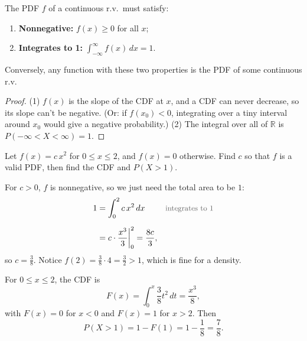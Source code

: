 \begin{theorem}\label{thm:validpdf}
The PDF $f$ of a continuous r.v.\ must satisfy:
\medskip
\begin{enumerate}
  \setlength{\itemsep}{0.4em}
  \item \textbf{Nonnegative:} $f(x) \ge 0$ for all $x$;
  \item \textbf{Integrates to 1:} $\displaystyle\int_{-\infty}^{\infty} f(x)\,dx = 1$.
\end{enumerate}
\medskip
Conversely, any function with these two properties is the PDF of some continuous r.v.
\end{theorem}

\medskip

\begin{proof}
(1) $f(x)$ is the slope of the CDF at $x$, and a CDF can never decrease, so its slope can't be negative. (Or: if $f(x_0) < 0$, integrating over a tiny interval around $x_0$ would give a negative probability.) (2) The integral over all of $\mathbb{R}$ is $P(-\infty < X < \infty) = 1$.
\end{proof}

\bigskip

\begin{example}\label{ex:cx2}
Let $f(x) = c\,x^{2}$ for $0 \le x \le 2$, and $f(x) = 0$ otherwise. Find $c$ so that $f$ is a valid PDF, then find the CDF and $P(X > 1)$.
\end{example}

\medskip

\begin{solution}
For $c > 0$, $f$ is nonnegative, so we just need the total area to be $1$:
\medskip
\begin{align*}
1 &= \int_{0}^{2} c\,x^{2}\,dx
  && \by{integrates to 1} \\[0.6em]
  &= c \cdot \frac{x^{3}}{3}\bigg|_{0}^{2} = \frac{8c}{3},
\end{align*}
\medskip
so $c = \tfrac{3}{8}$. Notice $f(2) = \tfrac{3}{8} \cdot 4 = \tfrac{3}{2} > 1$, which is fine for a density.

\medskip

For $0 \le x \le 2$, the CDF is
\medskip
\[
F(x) = \int_{0}^{x} \frac{3}{8} t^{2}\,dt = \frac{x^{3}}{8},
\]
\medskip
with $F(x) = 0$ for $x < 0$ and $F(x) = 1$ for $x > 2$. Then
\medskip
\[
P(X > 1) = 1 - F(1) = 1 - \frac{1}{8} = \frac{7}{8}.
\]
\end{solution}

